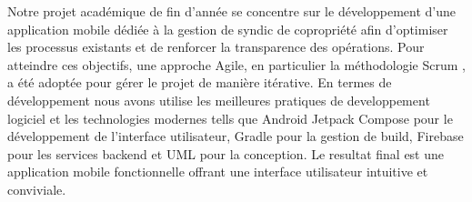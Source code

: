 Notre projet académique de fin d'année se concentre sur le développement d'une application mobile dédiée à la gestion de syndic de copropriété afin d'optimiser les processus existants et de renforcer la transparence des opérations.
Pour atteindre ces objectifs, une approche Agile, en particulier la méthodologie Scrum , a été adoptée pour gérer le projet de manière itérative.
En termes de développement nous avons utilise les meilleures pratiques de developpement logiciel et les technologies modernes tells que  Android Jetpack Compose pour le développement de l'interface utilisateur, Gradle pour la gestion de build, Firebase pour les services backend et UML pour la conception.
Le resultat final est une application mobile fonctionnelle offrant une interface utilisateur intuitive et conviviale.
